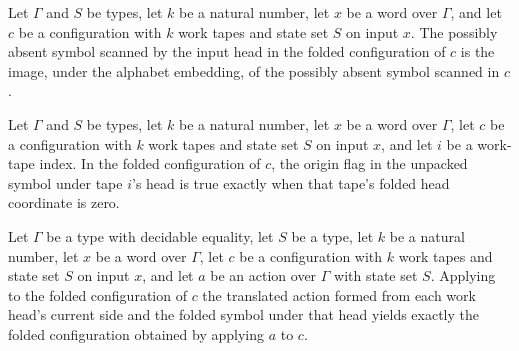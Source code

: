 \begin{lemma}
\label{Turing.FinTM.foldCfg_input}
\leanok
{}
Let $\Gamma$ and $S$ be types, let $k$ be a natural number, let $x$ be a word over
$\Gamma$, and let $c$ be a configuration with $k$ work tapes and state set $S$ on input
$x$. The possibly absent symbol scanned by the input head in the folded configuration of
$c$ is the image, under the alphabet embedding, of the possibly absent symbol scanned in
$c$.
\end{lemma}

\begin{lemma}
\label{Turing.FinTM.foldCfg_origin}
\leanok
{}
Let $\Gamma$ and $S$ be types, let $k$ be a natural number, let $x$ be a word over
$\Gamma$, let $c$ be a configuration with $k$ work tapes and state set $S$ on input $x$,
and let $i$ be a work-tape index. In the folded configuration of $c$, the origin flag in
the unpacked symbol under tape $i$'s head is true exactly when that tape's folded head
coordinate is zero.
\end{lemma}

\begin{lemma}
\label{Turing.FinTM.foldCfg_apply}
\leanok
{}
Let $\Gamma$ be a type with decidable equality, let $S$ be a type, let $k$ be a natural
number, let $x$ be a word over $\Gamma$, let $c$ be a configuration with $k$ work tapes
and state set $S$ on input $x$, and let $a$ be an action over $\Gamma$ with state set
$S$. Applying to the folded configuration of $c$ the translated action formed from each
work head's current side and the folded symbol under that head yields exactly the folded
configuration obtained by applying $a$ to $c$.
\end{lemma}

